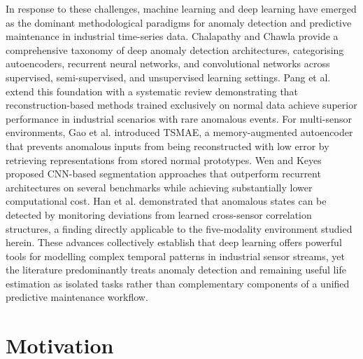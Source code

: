 In response to these challenges, machine learning and deep learning have emerged as the dominant methodological paradigms for anomaly detection and predictive maintenance in industrial time-series data. Chalapathy and Chawla \cite{Chalapathy2019} provide a comprehensive taxonomy of deep anomaly detection architectures, categorising autoencoders, recurrent neural networks, and convolutional networks across supervised, semi-supervised, and unsupervised learning settings. Pang et al. \cite{pang_deep_2021} extend this foundation with a systematic review demonstrating that reconstruction-based methods trained exclusively on normal data achieve superior performance in industrial scenarios with rare anomalous events. For multi-sensor environments, Gao et al. \cite{Gao2022} introduced TSMAE, a memory-augmented autoencoder that prevents anomalous inputs from being reconstructed with low error by retrieving representations from stored normal prototypes. Wen and Keyes \cite{wen_time_2019} proposed CNN-based segmentation approaches that outperform recurrent architectures on several benchmarks while achieving substantially lower computational cost. Han et al. \cite{Han2022} demonstrated that anomalous states can be detected by monitoring deviations from learned cross-sensor correlation structures, a finding directly applicable to the five-modality environment studied herein. These advances collectively establish that deep learning offers powerful tools for modelling complex temporal patterns in industrial sensor streams, yet the literature predominantly treats anomaly detection and remaining useful life estimation as isolated tasks rather than complementary components of a unified predictive maintenance workflow.

\section{Motivation}

